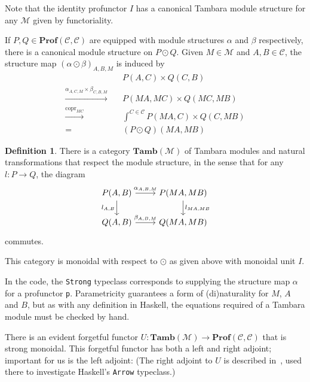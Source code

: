 \documentclass[11pt,letterpaper]{article}
\theoremstyle{plain}
\theoremstyle{definition}
\newtheorem{definition}[theorem]{Definition}
\newcommand{\C}{\mathscr{C}}
\newcommand{\M}{\mathscr{M}}
\newcommand{\Prof}{\mathbf{Prof}}
\newcommand{\Tamb}{\mathbf{Tamb}}
\DeclareMathOperator{\copr}{copr}
\begin{document}
Note that the identity profunctor $I$ has a canonical Tambara module structure for any $\M$ given by functoriality.

If $P, Q \in \Prof(\C, \C)$ are equipped with module structures $\alpha$ and $\beta$ respectively, there is a canonical module structure on $P \odot Q$. Given $M \in \M$ and $A,B \in \C$, the structure map ${(\alpha \odot \beta)}_{A,B,M}$ is induced by
\begin{align*}
  &P(A,C) \times Q(C,B)  \\
  \xrightarrow{\alpha_{A,C,M} \times \beta_{C,B,M}} \quad& P(MA, MC) \times Q(MC, MB) \\
  \xrightarrow{\copr_{MC}} \quad&\int^{C \in \C} P(MA, C) \times Q(C, MB) \\
  = \quad&(P \odot Q)(MA, MB)
\end{align*}

\begin{definition}
  There is a category $\Tamb(\M)$ of Tambara modules and natural transformations that respect the module structure, in the sense that for any $l : P \to Q$, the diagram
  \[
    \begin{tikzcd}
      P(A,B) \ar[r, "\alpha_{A,B,M}"] \ar[d, "l_{A,B}" left] & P(MA, MB) \ar[d, "l_{MA, MB}" right] \\
      Q(A,B) \ar[r, "\beta_{A,B,M}"] & Q(MA, MB)
    \end{tikzcd}
  \]
  commutes.
\end{definition}

This category is monoidal with respect to $\odot$ as given above with monoidal unit $I$.

  In the code, the \texttt{Strong} typeclass corresponds to supplying the structure map $\alpha$ for a profunctor \texttt{p}. Parametricity guarantees a form of (di)naturality for $M$, $A$ and $B$, but as with any definition in Haskell, the equations required of a Tambara module must be checked by hand.

There is an evident forgetful functor $U : \Tamb(\M) \to \Prof(\C, \C)$ that is strong monoidal. This forgetful functor has both a left and right adjoint; important for us is the left adjoint: (The right adjoint to $U$ is described in~\cite{NotionsOfComputationAsMonoids}, used there to investigate Haskell's \texttt{Arrow} typeclass.)
\end{document}
